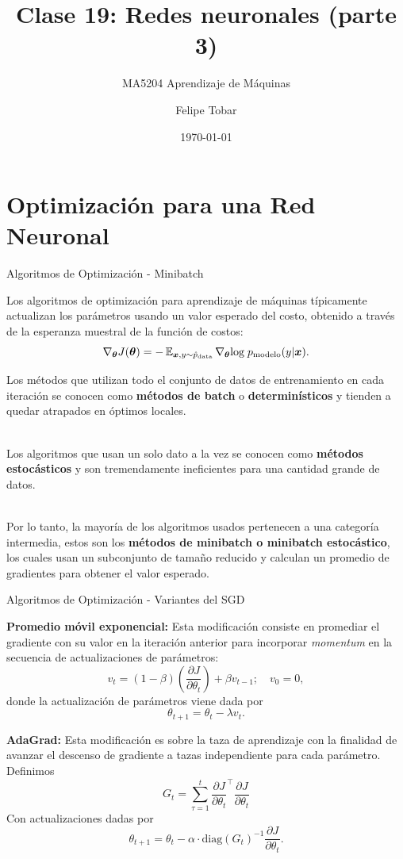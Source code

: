 \documentclass[handout, 9pt]{beamer}
\title{Clase 19: Redes neuronales (parte 3)}
\subtitle{MA5204 Aprendizaje de Máquinas}
\date{\today}
\author{Felipe Tobar}
\institute{Department of Mathematical Engineering \&\\ Center for Mathematical Modelling\\Universidad de Chile}
\begin{document}
\begin{frame}
  \titlepage
\end{frame}

\section{Optimización para una Red Neuronal}
\begin{frame}{Algoritmos de Optimización - Minibatch}

Los algoritmos de optimización para aprendizaje de máquinas típicamente actualizan los parámetros usando un valor esperado del costo, obtenido a través de la esperanza muestral de la función de costos: \pause
\begin{equation*}
\nabla_{\bm{\theta}}J(\bm{\theta}) = -\operatorname{\mathbb{E}}_{\bm{x},y\sim \hat{p}_{\textrm{data}}}\nabla_{\bm{\theta}}\textrm{log}\; p_{\textrm{modelo}}(y|\bm{x}).
\end{equation*} \pause

Los métodos que utilizan todo el conjunto de datos de entrenamiento en cada iteración se conocen como \textbf{métodos de batch} o \textbf{determinísticos} y tienden a quedar atrapados en óptimos locales. \\~\ \pause 

Los algoritmos que usan un solo dato a la vez se conocen como \textbf{métodos estocásticos} y son tremendamente ineficientes para una cantidad grande de datos. \\~\ 

Por lo tanto, la mayoría de los algoritmos usados pertenecen a una categoría intermedia, estos son los \textbf{métodos de minibatch o minibatch estocástico}, los cuales usan un subconjunto de tamaño reducido y calculan un promedio de gradientes para obtener el valor esperado.


\end{frame}

\begin{frame}{Algoritmos de Optimización - Variantes del SGD}

\textbf{Promedio móvil exponencial:} Esta modificación consiste en promediar el gradiente con su valor en la iteración anterior para incorporar \emph{momentum} en la secuencia de actualizaciones de parámetros: \pause
\[
v_t = (1-\beta) \left ( \frac{\partial J}{\partial \theta_t} \right ) + \beta v_{t-1};  \quad v_0 = 0,
\] \pause
donde la actualización de parámetros viene dada por 
\[
\theta_{t+1} = \theta_t - \lambda v_t.
\] \pause 

\textbf{AdaGrad:} Esta modificación es sobre la taza de aprendizaje con la finalidad de avanzar el descenso de gradiente a tazas independiente para cada parámetro. Definimos \pause
\[
G_{t} = \sum_{\tau=1}^t \frac{\partial J}{\partial \theta_t}^\top \frac{\partial J}{\partial \theta_t}
\] 
Con actualizaciones dadas por \pause
\[
\theta_ {t+1} = \theta_t - \alpha\cdot\text{diag}\left({G_t}\right)^{-1} \frac{\partial J}{\partial \theta_t}.
\]


\end{frame}
\end{document}

